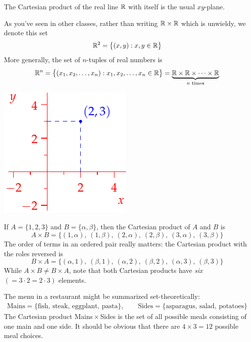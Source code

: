 \begin{examples}{}{}
	\exstart The Cartesian product of the real line $\mathbb{R}$ with itself is the usual $xy$-plane.
	\begin{enumerate}\setcounter{enumi}{1}
	\begin{minipage}[t]{0.7\linewidth}\vspace{-8pt}
		\item[]As you've seen in other classes, rather than writing $\mathbb{R}\times\mathbb{R}$ which is unwieldy, we denote this set
		\[
			\mathbb{R}^2=\bigl\{(x,y):x,y\in\mathbb{R}\bigr\}
		\]
		More generally, the set of $n$-tuples of real numbers is\footnotemark
		\[
			\mathbb{R}^n=\bigl\{(x_1,x_2,\ldots,x_n):x_1,x_2,\ldots,x_n\in\mathbb{R}\bigr\} =\underbrace{\mathbb{R}\times\mathbb{R}\times\cdots\times\mathbb{R}}_{\text{$n$ times}}
		\]
	\end{minipage}
	\hfill
	\begin{minipage}[t]{0.29\linewidth}\vspace{-8pt}
		\flushright\includegraphics{setsii-cartesianplane}
	\end{minipage}

		\item If $A=\{1,2,3\}$ and $B=\{\alpha,\beta\}$, then the Cartesian product of $A$ and $B$ is
		\[
			A\times B=\bigl\{(1,\alpha),\ (1,\beta),\ (2,\alpha),\ (2,\beta),\ (3,\alpha),\ (3,\beta)\bigr\}
		\]
		The order of terms in an ordered pair really matters: the Cartesian product with the roles reversed is 
		\[
			B\times A=\bigl\{(\alpha,1),\ (\beta,1),\ (\alpha,2),\ (\beta,2),\ (\alpha,3),\ (\beta,3)\bigr\}
		\]
		While $A\times B\neq B\times A$, note that both Cartesian products have \emph{six} $(=3\cdot 2=2\cdot 3)$ elements.
		
		\item The menu in a restaurant might be summarized set-theoretically:
		\begin{gather*}
			\text{Mains}=\{\text{fish, steak, eggplant, pasta}\}, \qquad 
			\text{Sides}=\{\text{asparagus, salad, potatoes}\}
		\end{gather*}
		The Cartesian product Mains\,$\times$\,Sides is the set of all possible meals consisting of one main and one side. It should be obvious that there are $4\times 3=12$ possible meal choices.
	\end{enumerate}
\end{examples}

